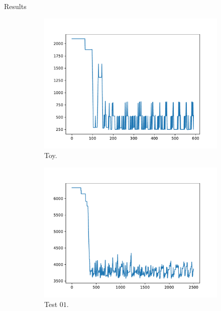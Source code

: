 \begin{section}{Results}
 \begin{figure}
     \centering
     \begin{subfigure}{0.45\textwidth}
         \includegraphics[width=\textwidth]{../logs/toy.pdf}
         \caption{Toy.}
     \end{subfigure}
     \begin{subfigure}{0.45\textwidth}
         \includegraphics[width=\textwidth]{../logs/test01.pdf}
         \caption{Test $01$.}
     \end{subfigure}
     \begin{subfigure}{0.45\textwidth}

\end{subfigure}
\end{figure}
\end{section}
